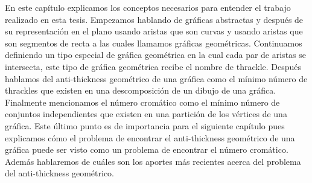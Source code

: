 En este capítulo explicamos los conceptos necesarios para entender el trabajo realizado
en esta tesis. Empezamos hablando de gráficas abstractas y después de su representación en
el plano usando aristas que son curvas y usando aristas que son segmentos de recta a las cuales
llamamos gráficas geométricas. Continuamos definiendo un tipo especial de gráfica geométrica
en la cual cada par de aristas se intersecta, este tipo de gráfica geométrica recibe el nombre de thrackle.
Después hablamos del anti-thickness geométrico de una gráfica como el mínimo número de thrackles que existen
en una descomposición de un dibujo de una gráfica. Finalmente mencionamos el número cromático
como el mínimo número de conjuntos independientes que existen en una partición de los vértices de una
gráfica. Este último punto es de importancia para el siguiente capítulo pues explicamos cómo
el problema de encontrar el anti-thickness geométrico de una gráfica puede ser visto como
un problema de encontrar el número cromático. Además hablaremos de cuáles son los aportes
más recientes acerca del problema del anti-thickness geométrico. 
